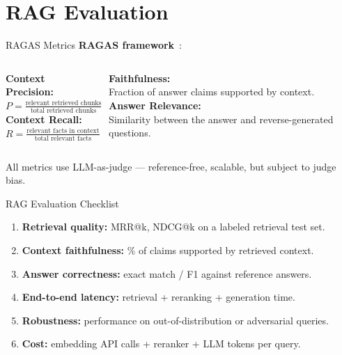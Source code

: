 \documentclass[aspectratio=169,10pt]{beamer}
\begin{document}
\section{RAG Evaluation}

\begin{frame}{RAGAS Metrics}
  \textbf{RAGAS framework}~\cite{es2023ragas}:
  \vspace{0.3em}
  \begin{columns}[T]
      \begin{tcolorbox}[hitbox, title=Retrieval Metrics]
        \textbf{Context Precision:}\\
        $P = \frac{\text{relevant retrieved chunks}}{\text{total retrieved chunks}}$\\[4pt]
        \textbf{Context Recall:}\\
        $R = \frac{\text{relevant facts in context}}{\text{total relevant facts}}$
      \end{tcolorbox}
      \begin{tcolorbox}[hitbox, title=Generation Metrics]
        \textbf{Faithfulness:}\\
        Fraction of answer claims supported by context.\\[4pt]
        \textbf{Answer Relevance:}\\
        Similarity between the answer and reverse-generated questions.
      \end{tcolorbox}
  \end{columns}
  \vspace{0.3em}
  All metrics use LLM-as-judge — reference-free, scalable, but subject to judge bias.
\end{frame}

\begin{frame}{RAG Evaluation Checklist}
  \begin{tcolorbox}[hitbox]
    \begin{enumerate}
      \item \textbf{Retrieval quality:} MRR@k, NDCG@k on a labeled retrieval test set.
      \item \textbf{Context faithfulness:} \% of claims supported by retrieved context.
      \item \textbf{Answer correctness:} exact match / F1 against reference answers.
      \item \textbf{End-to-end latency:} retrieval + reranking + generation time.
      \item \textbf{Robustness:} performance on out-of-distribution or adversarial queries.
      \item \textbf{Cost:} embedding API calls + reranker + LLM tokens per query.
    \end{enumerate}
  \end{tcolorbox}
\end{frame}
\end{document}
